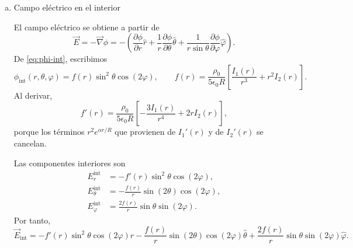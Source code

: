 \documentclass[a4paper]{article}
\begin{document}
\begin{enumerate}[a)]
Usando de nuevo $Y_{2,2}^*+Y_{2,-2}^*=\sqrt{15/(8\pi)}\sin^2\theta\cos(2\varphi)$, se obtiene
\begin{equation}
\label{eq:phi-int}
\boxed{
\begin{aligned}
\phi_{\mathrm{int}}(r,\theta,\varphi)
&=\frac{\rho_0}{5\epsilon_0R}\sin^2\theta\cos(2\varphi)
\left[\frac{I_1(r)}{r^3}+r^2I_2(r)\right].
\end{aligned}}
\end{equation}

    \item Campo eléctrico en el interior
    
    \begin{center}
\end{center}

El campo eléctrico se obtiene a partir de
\[
\vec E=-\vec\nabla\phi
=-\left(\frac{\partial\phi}{\partial r}\hat r
+\frac{1}{r}\frac{\partial\phi}{\partial\theta}\hat\theta
+\frac{1}{r\sin\theta}\frac{\partial\phi}{\partial\varphi}\hat\varphi\right).
\]
De \eqref{eq:phi-int}, escribimos
\[
\phi_{\mathrm{int}}(r,\theta,\varphi)=f(r)\sin^2\theta\cos(2\varphi),
\qquad
f(r)=\frac{\rho_0}{5\epsilon_0R}\left[\frac{I_1(r)}{r^3}+r^2I_2(r)\right].
\]
Al derivar,
\[
f'(r)=\frac{\rho_0}{5\epsilon_0R}\left[-\frac{3I_1(r)}{r^4}+2rI_2(r)\right],
\]
porque los términos $r^2e^{\alpha r/R}$ que provienen de $I_1'(r)$ y de $I_2'(r)$ se cancelan.

Las componentes interiores son
\begin{align*}
E_r^{\mathrm{int}}&=-f'(r)\sin^2\theta\cos(2\varphi),\\
E_\theta^{\mathrm{int}}&=-\frac{f(r)}{r}\sin(2\theta)\cos(2\varphi),\\
E_\varphi^{\mathrm{int}}&=\frac{2f(r)}{r}\sin\theta\sin(2\varphi).
\end{align*}
Por tanto,
\begin{equation}
\label{eq:e-int}
\boxed{
\vec E_{\mathrm{int}}
=-f'(r)\sin^2\theta\cos(2\varphi)\hat r
-\frac{f(r)}{r}\sin(2\theta)\cos(2\varphi)\hat\theta
+\frac{2f(r)}{r}\sin\theta\sin(2\varphi)\hat\varphi.}
\end{equation}


\end{enumerate}
\end{document}
